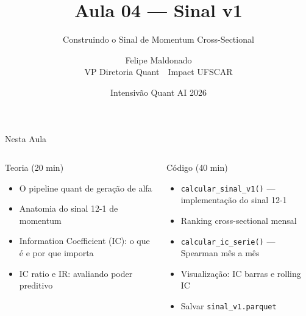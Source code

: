 \documentclass[aspectratio=169,12pt]{beamer}
\author{Felipe Maldonado\\{\scriptsize VP Diretoria Quant~\textbullet{}~Impact UFSCAR}}
\date{Intensivão Quant AI 2026}
\title{Aula 04 --- Sinal v1}
\subtitle{Construindo o Sinal de Momentum Cross-Sectional}
\begin{document}
\begin{frame}[plain]
\titlepage
\end{frame}

\begin{frame}[fragile]{Nesta Aula}
\begin{columns}[T]
\begin{block}{Teoria (20 min)}
\begin{itemize}
  \item O pipeline quant de geração de alfa
  \item Anatomia do sinal 12-1 de momentum
  \item Information Coefficient (IC): o que é e por que importa
  \item IC ratio e IR: avaliando poder preditivo
\end{itemize}
\end{block}
\begin{block}{Código (40 min)}
\begin{itemize}
  \item \texttt{calcular\_sinal\_v1()} — implementação do sinal 12-1
  \item Ranking cross-sectional mensal
  \item \texttt{calcular\_ic\_serie()} — Spearman mês a mês
  \item Visualização: IC barras e rolling IC
  \item Salvar \texttt{sinal\_v1.parquet}
\end{itemize}
\end{block}
\end{columns}
\end{frame}
\end{document}

